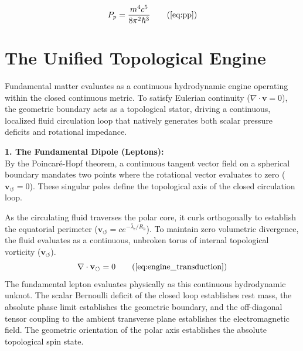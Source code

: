 \documentclass[11pt, a4paper]{article}
\begin{document}
\begin{tcolorbox}[recallbox, title={\ref{box:bag_pressure}. Confinement Pressure \& Work}]
\begin{equation}
    P_p = \frac{m^4 c^5}{8\pi^2 \hbar^3} \tag{\ref{eq:pp}}
\end{equation}
\end{tcolorbox}





\section{The Unified Topological Engine}
\label{sec:deriv_unified_engine}

Fundamental matter evaluates as a continuous hydrodynamic engine operating within the closed continuous metric. To satisfy Eulerian continuity ($\nabla \cdot \mathbf{v} = 0$), the geometric boundary acts as a topological stator, driving a continuous, localized fluid circulation loop that natively generates both scalar pressure deficits and rotational impedance.

\textbf{1. The Fundamental Dipole (Leptons):} \\
By the Poincaré-Hopf theorem, a continuous tangent vector field on a spherical boundary mandates two points where the rotational vector evaluates to zero ($\mathbf{v}_{\circlearrowleft} = 0$). These singular poles define the topological axis of the closed circulation loop. 

As the circulating fluid traverses the polar core, it curls orthogonally to establish the equatorial perimeter ($\mathbf{v}_{\circlearrowleft} = c e^{-\bar{\lambda}_c/R_h}$). To maintain   zero volumetric divergence, the fluid evaluates as a continuous, unbroken torus of internal topological vorticity ($\mathbf{v}_{\circlearrowleft}$). 
\begin{equation}
    \nabla \cdot \mathbf{v}_{\circlearrowleft} = 0 \tag{\ref{eq:engine_transduction}}
\end{equation}
The fundamental lepton evaluates physically as this continuous hydrodynamic unknot. The scalar Bernoulli deficit of the closed loop establishes rest mass, the absolute phase limit establishes the geometric boundary, and the off-diagonal tensor coupling to the ambient transverse plane establishes the electromagnetic field. The geometric orientation of the polar axis establishes the absolute topological spin state.
\end{document}
